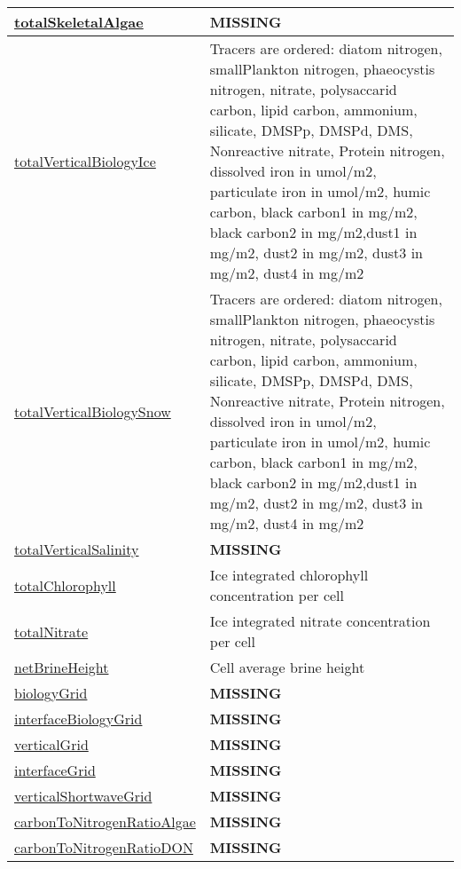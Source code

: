 {\begin{center}
\begin{longtable}{| p{2.0in} | p{4.0in} |}
    \hyperref[subsec:var_sec_biogeochemistry_totalSkeletalAlgae]{totalSkeletalAlgae} & {\bf \color{red} MISSING} \\
    \hline
    \hyperref[subsec:var_sec_biogeochemistry_totalVerticalBiologyIce]{totalVerticalBiologyIce} & Tracers are ordered: diatom nitrogen, smallPlankton nitrogen, phaeocystis nitrogen, nitrate, polysaccarid carbon, lipid carbon, ammonium, silicate, DMSPp, DMSPd, DMS, Nonreactive nitrate, Protein nitrogen, dissolved iron in umol/m2, particulate iron in umol/m2, humic carbon, black carbon1 in mg/m2, black carbon2 in mg/m2,dust1 in mg/m2, dust2 in mg/m2, dust3 in mg/m2, dust4 in mg/m2 \\
    \hline
    \hyperref[subsec:var_sec_biogeochemistry_totalVerticalBiologySnow]{totalVerticalBiologySnow} & Tracers are ordered: diatom nitrogen, smallPlankton nitrogen, phaeocystis nitrogen, nitrate, polysaccarid carbon, lipid carbon, ammonium, silicate, DMSPp, DMSPd, DMS, Nonreactive nitrate, Protein nitrogen, dissolved iron in umol/m2, particulate iron in umol/m2, humic carbon, black carbon1 in mg/m2, black carbon2 in mg/m2,dust1 in mg/m2, dust2 in mg/m2, dust3 in mg/m2, dust4 in mg/m2 \\
    \hline
    \hyperref[subsec:var_sec_biogeochemistry_totalVerticalSalinity]{totalVerticalSalinity} & {\bf \color{red} MISSING} \\
    \hline
    \hyperref[subsec:var_sec_biogeochemistry_totalChlorophyll]{totalChlorophyll} & Ice integrated chlorophyll concentration per cell \\
    \hline
    \hyperref[subsec:var_sec_biogeochemistry_totalNitrate]{totalNitrate} & Ice integrated nitrate concentration per cell \\
    \hline
    \hyperref[subsec:var_sec_biogeochemistry_netBrineHeight]{netBrineHeight} & Cell average brine height \\
    \hline
    \hyperref[subsec:var_sec_biogeochemistry_biologyGrid]{biologyGrid} & {\bf \color{red} MISSING} \\
    \hline
    \hyperref[subsec:var_sec_biogeochemistry_interfaceBiologyGrid]{interfaceBiologyGrid} & {\bf \color{red} MISSING} \\
    \hline
    \hyperref[subsec:var_sec_biogeochemistry_verticalGrid]{verticalGrid} & {\bf \color{red} MISSING} \\
    \hline
    \hyperref[subsec:var_sec_biogeochemistry_interfaceGrid]{interfaceGrid} & {\bf \color{red} MISSING} \\
    \hline
    \hyperref[subsec:var_sec_biogeochemistry_verticalShortwaveGrid]{verticalShortwaveGrid} & {\bf \color{red} MISSING} \\
    \hline
    \hyperref[subsec:var_sec_biogeochemistry_carbonToNitrogenRatioAlgae]{carbonToNitrogenRatioAlgae} & {\bf \color{red} MISSING} \\
    \hline
    \hyperref[subsec:var_sec_biogeochemistry_carbonToNitrogenRatioDON]{carbonToNitrogenRatioDON} & {\bf \color{red} MISSING} \\
    \hline
\end{longtable}
\end{center}
}
